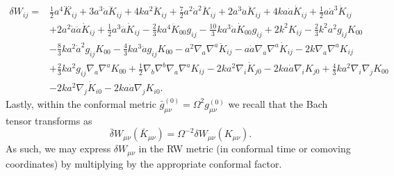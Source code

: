 \documentclass[10pt,letterpaper]{article}
\begin{document}
\begin{align}
\delta W_{ij}={}&\tfrac{1}{2} a^4 \overset{\text{...}.}{K}_{ij}
 + 3 a^3 \dot{a} \dddot{K}_{ij}
 + 4 k a^2 \ddot{K}_{ij}
 + \tfrac{7}{2} a^2 \dot{a}^2 \ddot{K}_{ij}
 + 2 a^3 \ddot{a} \ddot{K}_{ij}
 + 4 k a \dot{a} \dot{K}_{ij}
 + \tfrac{1}{2} a \dot{a}^3 \dot{K}_{ij}\nonumber\\
& + 2 a^2 \dot{a} \ddot{a} \dot{K}_{ij}
 + \tfrac{1}{2} a^3 \dddot{a} \dot{K}_{ij}
 -  \tfrac{2}{3} k a^4 \ddot{K}_{00} g_{ij}
 -  \tfrac{10}{3} k a^3 \dot{a} \dot{K}_{00} g_{ij}
 + 2 k^2 K_{ij}
 -  \tfrac{2}{3} k^2 a^2 g_{ij} K_{00}\nonumber\\
& -  \tfrac{8}{3} k a^2 \dot{a}^2 g_{ij} K_{00}
 -  \tfrac{4}{3} k a^3 \ddot{a} g_{ij} K_{00}
 -  a^2 \nabla_{a}\nabla^{a}\ddot{K}_{ij}
 -  a \dot{a} \nabla_{a}\nabla^{a}\dot{K}_{ij}
 - 2 k \nabla_{a}\nabla^{a}K_{ij}\nonumber\\
& + \tfrac{2}{3} k a^2 g_{ij} \nabla_{a}\nabla^{a}K_{00}
 + \tfrac{1}{2} \nabla_{b}\nabla^{b}\nabla_{a}\nabla^{a}K_{ij}
 - 2 k a^2 \nabla_{i}\dot{K}_{j0}
 - 2 k a \dot{a} \nabla_{i}K_{j0}
 + \tfrac{4}{3} k a^2 \nabla_{i}\nabla_{j}K_{00}\nonumber\\
& - 2 k a^2 \nabla_{j}\dot{K}_{i0}
 - 2 k a \dot{a} \nabla_{j}K_{i0}.
\end{align}
Lastly, within the conformal metric $\bar g_{\mu\nu}^{(0)} = \Omega^2 g_{\mu\nu}^{(0)}$ we recall that the Bach tensor transforms as
\begin{equation}
\bar \delta W_{\mu\nu}(\bar K_{\mu\nu}) = \Omega^{-2}\delta W_{\mu\nu}(K_{\mu\nu}).
\end{equation}
As such, we may express $\delta W_{\mu\nu}$ in the RW metric (in conformal time or comoving coordinates) by multiplying by the appropriate conformal factor.
\\ \\
\end{document}

